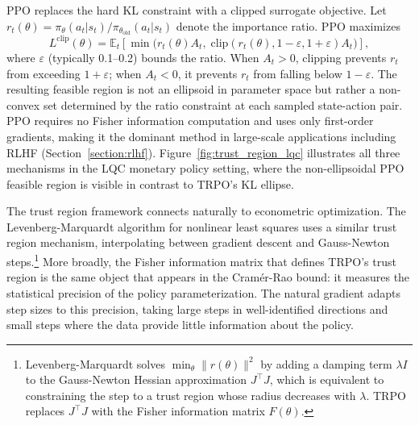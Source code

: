 PPO \citep{Schulman2017} replaces the hard KL constraint with a clipped surrogate objective. Let $r_t(\theta) = \pi_\theta(a_t|s_t) / \pi_{\theta_{\mathrm{old}}}(a_t|s_t)$ denote the importance ratio. PPO maximizes
\begin{equation}
\label{eq:ppo}
L^{\mathrm{clip}}(\theta) = \mathbb{E}_t \left[ \min\!\big( r_t(\theta) A_t, \; \mathrm{clip}(r_t(\theta), 1-\varepsilon, 1+\varepsilon) A_t \big) \right],
\end{equation}
where $\varepsilon$ (typically 0.1--0.2) bounds the ratio. When $A_t > 0$, clipping prevents $r_t$ from exceeding $1+\varepsilon$; when $A_t < 0$, it prevents $r_t$ from falling below $1-\varepsilon$. The resulting feasible region is not an ellipsoid in parameter space but rather a non-convex set determined by the ratio constraint at each sampled state-action pair. PPO requires no Fisher information computation and uses only first-order gradients, making it the dominant method in large-scale applications including RLHF (Section~\ref{section:rlhf}). Figure~\ref{fig:trust_region_lqc} illustrates all three mechanisms in the LQC monetary policy setting, where the non-ellipsoidal PPO feasible region is visible in contrast to TRPO's KL ellipse.

The trust region framework connects naturally to econometric optimization. The Levenberg-Marquardt algorithm for nonlinear least squares uses a similar trust region mechanism, interpolating between gradient descent and Gauss-Newton steps.\footnote{Levenberg-Marquardt solves $\min_\theta \|r(\theta)\|^2$ by adding a damping term $\lambda I$ to the Gauss-Newton Hessian approximation $J^\top J$, which is equivalent to constraining the step to a trust region whose radius decreases with $\lambda$. TRPO replaces $J^\top J$ with the Fisher information matrix $F(\theta)$.} More broadly, the Fisher information matrix that defines TRPO's trust region is the same object that appears in the Cram\'er-Rao bound: it measures the statistical precision of the policy parameterization. The natural gradient adapts step sizes to this precision, taking large steps in well-identified directions and small steps where the data provide little information about the policy.

